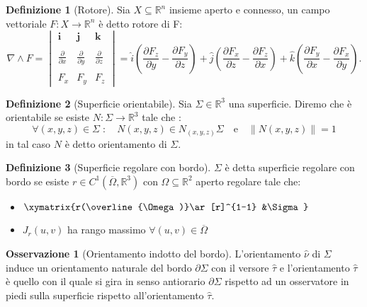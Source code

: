 \documentclass[leqno]{article}
\theoremstyle{definition}
\newtheorem{definition}{Definizione}[section]
\numberwithin{equation}{section}
\newtheorem{observation}[theorem]{Osservazione}
\theoremstyle{remark}
\begin{document}
		\begin{definition}[Rotore]
			Sia $X \subseteq \mathbb{R}^n$ insieme aperto e connesso, un campo vettoriale $F:X \to \mathbb{R}^n$ è detto rotore di F:
			\begin{equation}
				\nabla \wedge F= \begin{vmatrix}\mathbf {i} &\mathbf {j} &\mathbf {k} \\\\{\frac {\partial }{\partial x}}&{\frac {\partial }{\partial y}}&{\frac {\partial }{\partial z}}\\\\F_{x}&F_{y}&F_{z}\end{vmatrix}=\hat{i} \left({\frac {\partial F_{z}}{\partial y}}-{\frac {\partial F_{y}}{\partial z}}\right)+\hat{j} \left({\frac {\partial F_{x}}{\partial z}}-{\frac {\partial F_{z}}{\partial x}}\right)+\hat{k} \left({\frac {\partial F_{y}}{\partial x}}-{\frac {\partial F_{x}}{\partial y}}\right).
			\end{equation}
		\end{definition}
		
		\begin{definition}[Superficie orientabile]
			Sia $\Sigma \in \mathbb{R}^3 $ una superficie. Diremo che è   orientabile se esiste $N:\Sigma \to \mathbb{R}^3$ tale che :
			\begin{equation}
				\forall(x,y,z)\in \Sigma \; : \quad N(x,y,z)\in N_{(x,y,z)}\Sigma \quad \text{e} \quad \lVert N(x,y,z) \rVert = 1
			\end{equation}
			in tal caso $N$ è detto orientamento di $\Sigma$.
		\end{definition}
		
		\begin{definition}[Superficie regolare con bordo]
			$\Sigma$ è detta superficie regolare con bordo se esiste $r\in C^1(\overline{\Omega}, \mathbb{R}^3)$ con $\Omega \subseteq \mathbb{R}^2$ aperto regolare tale che:
			\begin{itemize}
				\item $\xymatrix{r(\overline{\Omega)}\ar[r]^{1-1} &\Sigma}$
				\item $J_r(u,v)$ ha rango massimo $\forall (u,v)\in \overline{\Omega}$
			\end{itemize}
		\end{definition}
		
		\begin{observation}[Orientamento indotto del bordo]
			L'orientamento $\hat{\nu}$ di $\Sigma$ induce un orientamento naturale del bordo $\partial \Sigma$ con il versore $\hat{\tau}$ e l'orientamento $\hat{\tau}$ è quello con il quale si gira in senso antiorario $\partial\Sigma$ rispetto ad un osservatore in piedi sulla superficie rispetto all'orientamento $\hat{\tau}$.
		\end{observation}
		
\end{document}
